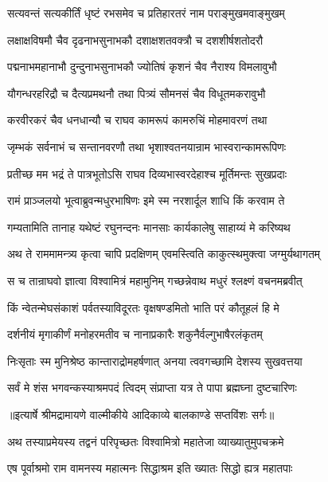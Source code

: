 \twolineshloka
{सत्यवन्तं सत्यकीर्तिं धृष्टं रभसमेव च}
{प्रतिहारतरं नाम पराङ्मुखमवाङ्मुखम्} %

\twolineshloka
{लक्षाक्षविषमौ चैव दृढनाभसुनाभकौ}
{दशाक्षशतवक्त्रौ च दशशीर्षशतोदरौ} %

\twolineshloka
{पद्मनाभमहानाभौ दुन्दुनाभसुनाभकौ}
{ज्योतिषं कृशनं चैव नैराश्य विमलावुभौ} %

\twolineshloka
{यौगन्धरहरिद्रौ च दैत्यप्रमथनौ तथा}
{पित्र्यं सौमनसं चैव विधूतमकरावुभौ} %

\twolineshloka
{करवीरकरं चैव धनधान्यौ च राघव}
{कामरूपं कामरुचिं मोहमावरणं तथा} %

\twolineshloka
{जृम्भकं सर्वनाभं च सन्तानवरणौ तथा}
{भृशाश्वतनयान्राम भास्वरान्कामरूपिणः} %

\twolineshloka
{प्रतीच्छ मम भद्रं ते पात्रभूतोऽसि राघव}
{दिव्यभास्वरदेहाश्च मूर्तिमन्तः सुखप्रदाः} %

\twolineshloka
{रामं प्राञ्जलयो भूत्वाब्रुवन्मधुरभाषिणः}
{इमे स्म नरशार्दूल शाधि किं करवाम ते} %

\twolineshloka
{गम्यतामिति तानाह यथेष्टं रघुनन्दनः}
{मानसाः कार्यकालेषु साहाय्यं मे करिष्यथ} %

\twolineshloka
{अथ ते राममामन्त्र्य कृत्वा चापि प्रदक्षिणम्}
{एवमस्त्विति काकुत्स्थमुक्त्वा जग्मुर्यथागतम्} %

\twolineshloka
{स च तान्राघवो ज्ञात्वा विश्वामित्रं महामुनिम्}
{गच्छन्नेवाथ मधुरं श्लक्ष्णं वचनमब्रवीत्} %

\twolineshloka
{किं न्वेतन्मेघसंकाशं पर्वतस्याविदूरतः}
{वृक्षषण्डमितो भाति परं कौतूहलं हि मे} %

\twolineshloka
{दर्शनीयं मृगाकीर्णं मनोहरमतीव च}
{नानाप्रकारैः शकुनैर्वल्गुभाषैरलंकृतम्} %

\twolineshloka
{निःसृताः स्म मुनिश्रेष्ठ कान्ताराद्रोमहर्षणात्}
{अनया त्ववगच्छामि देशस्य सुखवत्तया} %

\twolineshloka
{सर्वं मे शंस भगवन्कस्याश्रमपदं त्विदम्}
{संप्राप्ता यत्र ते पापा ब्रह्मघ्ना दुष्टचारिणः} %


{॥इत्यार्षे श्रीमद्रामायणे वाल्मीकीये आदिकाव्ये बालकाण्डे सप्तविंशः सर्गः॥}


\twolineshloka
{अथ तस्याप्रमेयस्य तद्वनं परिपृच्छतः}
{विश्वामित्रो महातेजा व्याख्यातुमुपचक्रमे} %

\twolineshloka
{एष पूर्वाश्रमो राम वामनस्य महात्मनः}
{सिद्धाश्रम इति ख्यातः सिद्धो ह्यत्र महातपाः} %

